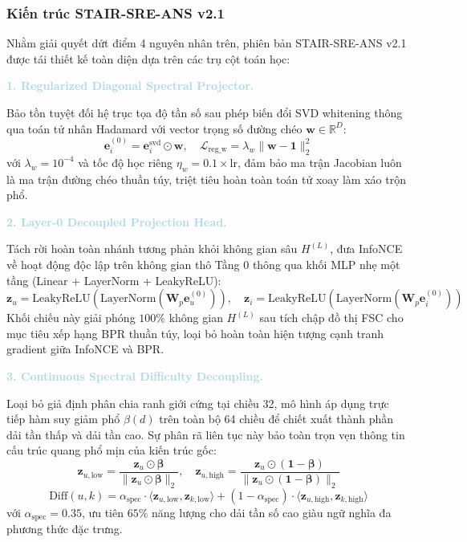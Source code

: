 \subsubsection{Kiến trúc STAIR-SRE-ANS v2.1}

Nhằm giải quyết dứt điểm 4 nguyên nhân trên, phiên bản STAIR-SRE-ANS v2.1 được tái thiết kế toàn diện dựa trên các trụ cột toán học:

\noindent\textcolor{lightblue}{\textbf{1. Regularized Diagonal Spectral Projector.}}

Bảo tồn tuyệt đối hệ trục tọa độ tần số sau phép biến đổi SVD whitening thông qua toán tử nhân Hadamard với vector trọng số đường chéo $\mathbf{w} \in \mathbb{R}^D$:
\begin{equation}
\mathbf{e}_i^{(0)} = \mathbf{e}_i^{\text{svd}} \odot \mathbf{w}, \quad \mathcal{L}_{\text{reg\_w}} = \lambda_w \|\mathbf{w} - \mathbf{1}\|_2^2
\end{equation}
với $\lambda_w = 10^{-4}$ và tốc độ học riêng $\eta_w = 0.1 \times \text{lr}$, đảm bảo ma trận Jacobian luôn là ma trận đường chéo thuần túy, triệt tiêu hoàn toàn toán tử xoay làm xáo trộn phổ.

\noindent\textcolor{lightblue}{\textbf{2. Layer-0 Decoupled Projection Head.}}

Tách rời hoàn toàn nhánh tương phản khỏi không gian sâu $H^{(L)}$, đưa InfoNCE về hoạt động độc lập trên không gian thô Tầng 0 thông qua khối MLP nhẹ một tầng (Linear + LayerNorm + LeakyReLU):
\begin{equation}
\mathbf{z}_u = \text{LeakyReLU}(\text{LayerNorm}(\mathbf{W}_p \mathbf{e}_u^{(0)})), \quad \mathbf{z}_i = \text{LeakyReLU}(\text{LayerNorm}(\mathbf{W}_p \mathbf{e}_i^{(0)}))
\end{equation}
Khối chiếu này giải phóng $100\%$ không gian $H^{(L)}$ sau tích chập đồ thị FSC cho mục tiêu xếp hạng BPR thuần túy, loại bỏ hoàn toàn hiện tượng cạnh tranh gradient giữa InfoNCE và BPR.

\noindent\textcolor{lightblue}{\textbf{3. Continuous Spectral Difficulty Decoupling.}}

Loại bỏ giả định phân chia ranh giới cứng tại chiều 32, mô hình áp dụng trực tiếp hàm suy giảm phổ $\beta(d)$ trên toàn bộ 64 chiều để chiết xuất thành phần dải tần thấp và dải tần cao. Sự phân rã liên tục này bảo toàn trọn vẹn thông tin cấu trúc quang phổ mịn của kiến trúc gốc:
\begin{equation}
\mathbf{z}_{u, \text{low}} = \frac{\mathbf{z}_u \odot \boldsymbol{\beta}}{\|\mathbf{z}_u \odot \boldsymbol{\beta}\|_2}, \quad \mathbf{z}_{u, \text{high}} = \frac{\mathbf{z}_u \odot (\mathbf{1} - \boldsymbol{\beta})}{\|\mathbf{z}_u \odot (\mathbf{1} - \boldsymbol{\beta})\|_2}
\end{equation}
\begin{equation}
\text{Diff}(u, k) = \alpha_{\text{spec}} \cdot \langle \mathbf{z}_{u, \text{low}}, \mathbf{z}_{k, \text{low}} \rangle + (1 - \alpha_{\text{spec}}) \cdot \langle \mathbf{z}_{u, \text{high}}, \mathbf{z}_{k, \text{high}} \rangle
\end{equation}
với $\alpha_{\text{spec}} = 0.35$, ưu tiên $65\%$ năng lượng cho dải tần số cao giàu ngữ nghĩa đa phương thức đặc trưng.

